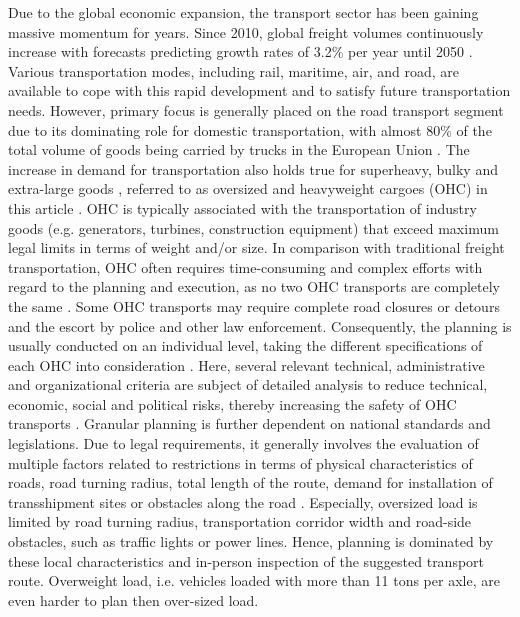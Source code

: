 
Due to the global economic expansion, the transport sector has been gaining massive momentum for years.
Since 2010, global freight volumes continuously increase with forecasts predicting growth rates of 3.2\% per year until 2050 \cite{figura2020preferences, InternationalTransportForum}.
Various transportation modes, including rail, maritime, air, and road, are available to cope with this rapid development and to satisfy future transportation needs.
However, primary focus is generally placed on the road transport segment due to its dominating role for domestic transportation, with almost 80\% of the total volume of goods being carried by trucks in the European Union \cite{Eurostat}.
The increase in demand for transportation also holds true for superheavy, bulky and extra-large goods \cite{gavrilova2021analysis}, referred to as oversized and heavyweight cargoes (OHC) in this article \cite{Luo.2021}.
OHC is typically associated with the transportation of industry goods (e.g. generators, turbines, construction equipment) that exceed maximum legal limits in terms of weight and/or size.
In comparison with traditional freight transportation, OHC often requires time-consuming and complex efforts with regard to the planning and execution, as no two OHC transports are completely the same \cite{Wolnowska.2019}.
Some OHC transports may require complete road closures or detours and the escort by police and other law enforcement.
Consequently, the planning is usually conducted on an individual level, taking the different specifications of each OHC into consideration \cite{Bazaras.2013}.
Here, several relevant technical, administrative and organizational criteria are subject of detailed analysis to reduce technical, economic, social and political risks, thereby increasing the safety of OHC transports \cite{Palsaitis.2012}.
Granular planning is further dependent on national standards and legislations. Due to legal requirements, it generally involves the evaluation of multiple factors related to restrictions in terms of physical characteristics of roads, road turning radius, total length of the route, demand for installation of transshipment sites or obstacles along the road \cite{PETRASKA.2018}.
Especially, oversized load is limited by road turning radius, transportation corridor width and road-side obstacles, such as traffic lights or power lines.
Hence, planning is dominated by these local characteristics and in-person inspection of the suggested transport route.
Overweight load, i.e. vehicles loaded with more than 11 tons per axle, are even harder to plan then over-sized load.
